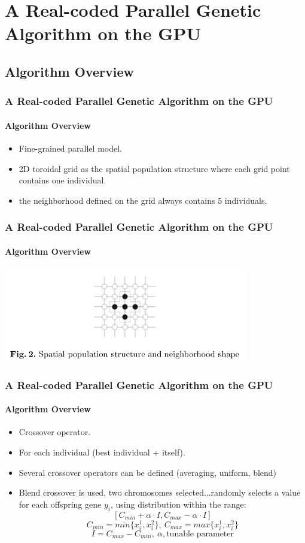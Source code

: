 \section{A Real-coded Parallel Genetic Algorithm on the GPU}
\subsection{Algorithm Overview}
\frame
{
\frametitle{A Real-coded Parallel Genetic Algorithm on the GPU}
\framesubtitle{Algorithm Overview}
\begin{itemize}
	\item Fine-grained parallel model.
	\item 2D toroidal grid as the spatial population structure where each grid point contains one individual.
	\item the neighborhood defined on the grid always contains 5 individuals.
\end{itemize}
}

\frame
{
\frametitle{A Real-coded Parallel Genetic Algorithm on the GPU}
\framesubtitle{Algorithm Overview}
\begin{center}
	\includegraphics[width=0.8\textwidth]{img/vecinos}
\end{center}
}

\frame
{
\frametitle{A Real-coded Parallel Genetic Algorithm on the GPU}
\framesubtitle{Algorithm Overview}
\begin{itemize}
	\item Crossover operator.
	\item For each individual (best individual + itself).
	\item Several crossover operators can be defined (averaging, uniform, blend)
	\item Blend crossover is used, two chromosomes selected...randomly selects a value for each offspring gene $y_i$, using distribution within the range:
	$$\left[C_{min} + \alpha \cdot I, C_{max} - \alpha \cdot I\right]$$ 
	$$ C_{min} = min\{x_{i}^{1}, x_{i}^{2}\},\ C_{max} = max\{x_{i}^{1}, x_{i}^{2}\}$$
	$$ I = C_{max} - C_{min},\ \alpha, \text{tunable parameter} $$
\end{itemize}
}

